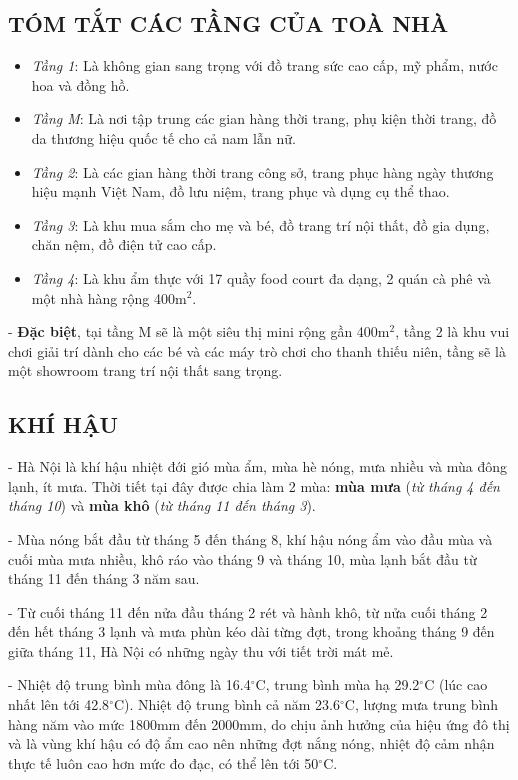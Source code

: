 	\subsection{TÓM TẮT CÁC TẦNG CỦA TOÀ NHÀ}
	\begin{itemize}
	\setlength\itemsep{1mm}
		\item \emph{Tầng 1}: Là không gian sang trọng với đồ trang sức cao cấp, mỹ phẩm, nước hoa và đồng hồ.
	
		\item \emph{Tầng M}: Là nơi tập trung các gian hàng thời trang, phụ kiện thời trang, đồ da thương hiệu quốc tế cho cả nam lẫn nữ.
	
		\item \emph{Tầng 2}: Là các gian hàng thời trang công sở, trang phục hàng ngày thương hiệu mạnh Việt Nam, đồ lưu niệm, trang phục và dụng cụ thể thao.
	
		\item \emph{Tầng 3}: Là khu mua sắm cho mẹ và bé, đồ trang trí nội thất, đồ gia dụng, chăn nệm, đồ điện tử cao cấp.
	
		\item \emph{Tầng 4}: Là khu ẩm thực với 17 quầy food court đa dạng, 2 quán cà phê và một nhà hàng rộng 400m$^{2}$.
	\end{itemize}
	
	- \textbf{Đặc biệt}, tại tầng M sẽ là một siêu thị mini rộng gần 400m$^{2}$, tầng 2 là khu vui chơi giải trí dành cho các bé và các máy trò chơi cho thanh thiếu niên, tầng sẽ là một showroom trang trí nội thất sang trọng.
	
	\subsection{KHÍ HẬU}
	- Hà Nội là khí hậu nhiệt đới gió mùa ẩm, mùa hè nóng, mưa nhiều và mùa đông lạnh, ít mưa. Thời tiết tại đây được chia làm 2 mùa: \textbf{mùa mưa} (\emph{từ tháng 4 đến tháng 10}) và \textbf{mùa khô} (\emph{từ tháng 11 đến tháng 3}).
	
	- Mùa nóng bắt đầu từ tháng 5 đến tháng 8, khí hậu nóng ẩm vào đầu mùa và cuối mùa mưa nhiều, khô ráo vào tháng 9 và tháng 10, mùa lạnh bắt đầu từ tháng 11 đến tháng 3 năm sau.
	
	- Từ cuối tháng 11 đến nửa đầu tháng 2 rét và hành khô, từ nửa cuối tháng 2 đến hết tháng 3 lạnh và mưa phùn kéo dài từng đợt, trong khoảng tháng 9 đến giữa tháng 11, Hà Nội có những ngày thu với tiết trời mát mẻ.
	
	- Nhiệt độ trung bình mùa đông là 16.4$^{\circ}$C, trung bình mùa hạ 29.2$^{\circ}$C (lúc cao nhất lên tới 42.8$^{\circ}$C). Nhiệt độ trung bình cả năm 23.6$^{\circ}$C, lượng mưa trung bình hàng năm vào mức 1800mm đến 2000mm, do chịu ảnh hưởng của hiệu ứng đô thị và là vùng khí hậu có độ ẩm cao nên những đợt nắng nóng, nhiệt độ cảm nhận thực tế luôn cao hơn mức đo đạc, có thể lên tới 50$^{\circ}$C.
	
